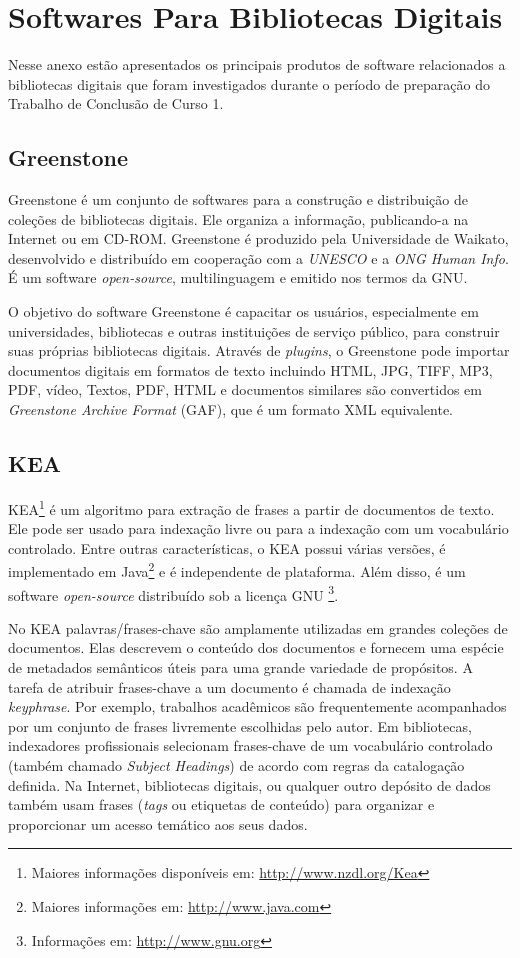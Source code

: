 \chapter{Softwares Para Bibliotecas Digitais}
\label{Att:anexobibliotecas}

Nesse anexo estão apresentados os principais produtos de software relacionados a bibliotecas digitais que foram investigados durante o período de preparação do Trabalho de Conclusão de Curso 1.

\section*{Greenstone} 

Greenstone é um conjunto de softwares para a construção e distribuição de coleções de bibliotecas digitais. Ele organiza a informação, publicando-a na Internet ou em CD-ROM. Greenstone é produzido pela Universidade de Waikato, desenvolvido e distribuído em cooperação com a \textit{UNESCO} e a \textit{ONG Human Info}. É um software \textit{open-source}, multilinguagem e emitido nos termos da GNU.
 
O objetivo do software Greenstone é capacitar os usuários, especialmente em universidades, bibliotecas e outras instituições de serviço público, para construir suas próprias bibliotecas digitais. Através de \textit{plugins}, o Greenstone pode importar documentos digitais em formatos de texto incluindo HTML, JPG, TIFF, MP3, PDF, vídeo, Textos, PDF, HTML e documentos similares são convertidos em \textit{Greenstone Archive Format} (GAF), que é um formato XML equivalente.

\section*{KEA}

KEA\footnote{Maiores informações disponíveis em: \url{http://www.nzdl.org/Kea}} é um algoritmo para extração de frases a partir de documentos de texto. Ele pode ser usado para indexação livre ou para a indexação com um vocabulário controlado. Entre outras características, o KEA possui várias versões, é implementado em Java\footnote{Maiores informações em: \url{http://www.java.com}} e é independente de plataforma. Além disso, é um software \textit{open-source} distribuído sob a licença GNU \footnote{Informações em: \url{http://www.gnu.org}}.

No KEA palavras/frases-chave são amplamente utilizadas em grandes coleções de documentos. Elas descrevem o conteúdo dos documentos e fornecem uma espécie de metadados semânticos úteis para uma grande variedade de propósitos. A tarefa de atribuir frases-chave a um documento é chamada de indexação \textit{keyphrase}. Por exemplo, trabalhos acadêmicos são frequentemente acompanhados por um conjunto de frases livremente escolhidas pelo autor. Em bibliotecas, indexadores profissionais selecionam frases-chave de um vocabulário controlado (também chamado \textit{Subject Headings}) de acordo com regras da catalogação definida. Na Internet, bibliotecas digitais, ou qualquer outro depósito de dados também usam frases (\textit{tags} ou etiquetas de conteúdo) para organizar e proporcionar um acesso temático aos seus dados.


